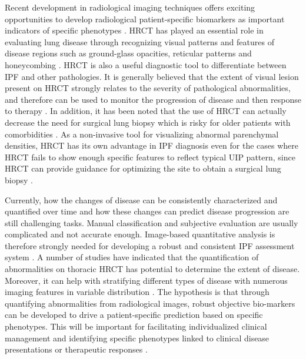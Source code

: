 Recent development in radiological imaging techniques offers exciting opportunities to develop radiological patient-specific biomarkers as important indicators of specific phenotypes \citep{devaraj2014imaging,gotway2007challenges}. HRCT has played an essential role in evaluating lung disease through recognizing visual patterns and features of disease regions such as ground-glass opacities, reticular patterns and honeycombing \citep{mueller2007every}. HRCT is also a useful diagnostic tool to differentiate between IPF and other pathologies. It is generally believed that the extent of visual lesion present on HRCT strongly relates to the severity of pathological abnormalities, and therefore can be used to monitor the progression of disease and then response to therapy \citep{kazerooni1997thin,kim1999nonspecific,wells2003idiopathic,saketkoo2011developing}. In addition, it has been noted that the use of HRCT can actually decrease the need for surgical lung biopsy which is risky for older patients with comorbidities \citep{bartholmai2013quantitative}. As a non-invasive tool for visualizing abnormal parenchymal densities, HRCT has its own advantage in IPF diagnosis even for the cases where HRCT fails to show enough specific features to reflect typical UIP pattern, since HRCT can provide guidance for optimizing the site to obtain a surgical lung biopsy \citep{kazerooni2001high, diette2005high, misumi2006idiopathic, costabel2007diffuse}. 

Currently, how the changes of disease can be consistently characterized and quantified over time and how these changes can predict disease progression are still challenging tasks. Manual classification and subjective evaluation are usually complicated and not accurate enough. Image-based quantitative analysis is therefore strongly needed for developing a robust and consistent IPF assessment system \citep{gotway2007challenges,lynch2005high}. A number of studies have indicated that the quantification of abnormalities on thoracic HRCT has potential to determine the extent of disease. Moreover, it can help with stratifying different types of disease with numerous imaging features in variable distribution \citep{best2008idiopathic,wells2003idiopathic, sumikawa2008computed, bartholmai2013quantitative}. The hypothesis is that through quantifying abnormalities from radiological images, robust objective bio-markers can be developed to drive a patient-specific prediction based on specific phenotypes. This will be important for facilitating individualized clinical management and identifying specific phenotypes linked to clinical disease presentations or therapeutic responses \citep{raghunath2014quantitative}.
\newpage

